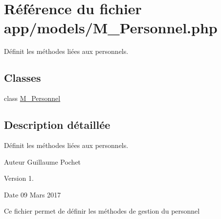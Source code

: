\hypertarget{_m___personnel_8php}{}\section{Référence du fichier app/models/\+M\+\_\+\+Personnel.php}
\label{_m___personnel_8php}


Définit les méthodes liées aux personnels.  


\subsection*{Classes}
\begin{DoxyCompactItemize}
\item 
class \hyperlink{class_m___personnel}{M\+\_\+\+Personnel}
\end{DoxyCompactItemize}


\subsection{Description détaillée}
Définit les méthodes liées aux personnels. 

\begin{DoxyAuthor}{Auteur}
Guillaume Pochet 
\end{DoxyAuthor}
\begin{DoxyVersion}{Version}
1. 
\end{DoxyVersion}
\begin{DoxyDate}{Date}
09 Mars 2017
\end{DoxyDate}
Ce fichier permet de définir les méthodes de gestion du personnel 